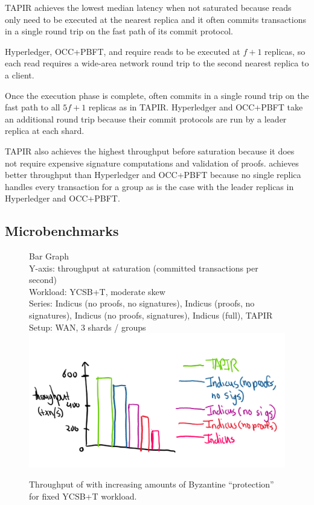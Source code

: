 TAPIR achieves the lowest median latency when not saturated because reads only
need to be executed at the nearest replica and it often commits transactions in
a single round trip on the fast path of its commit protocol.

Hyperledger, OCC+PBFT, and \sys{} require reads to be
executed at $f+1$ replicas, so each read requires a wide-area network round trip
to the second nearest replica to a client.

Once the execution phase is complete,
\sys{} often commits in a single round trip on the fast path to all $5f+1$
replicas as in TAPIR. Hyperledger and OCC+PBFT take an additional round trip
because their commit protocols are run by a leader replica at each shard.

TAPIR also achieves the highest throughput before saturation because it does not
require expensive signature computations and validation of proofs. \sys{} achieves
better throughput than Hyperledger and OCC+PBFT because no single replica handles
every transaction for a group as is the case with the leader replicas in Hyperledger
and OCC+PBFT.

\subsection{Microbenchmarks}

\begin{figure}
  Bar Graph\\
  Y-axis: throughput at saturation (committed transactions per second)\\
  Workload: YCSB+T, moderate skew\\
  Series: Indicus (no proofs, no signatures), Indicus (proofs, no signatures),
    Indicus (no proofs, signatures), Indicus (full), TAPIR\\
  Setup: WAN, 3 shards / groups\\
  \includegraphics[width=\columnwidth]{figures/eval/bft-overhead-tput.png}
  \caption{Throughput of \sys{} with increasing amounts of Byzantine
  ``protection'' for fixed YCSB+T workload.}
  \label{fig:bft-overhead-tput}
\end{figure}

